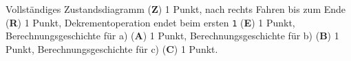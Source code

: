 \begin{bewertung}
Vollständiges Zustandsdiagramm ({\bf Z}) 1 Punkt,
nach rechts Fahren bis zum Ende ({\bf R}) 1 Punkt,
Dekrementoperation endet beim ersten \texttt{1} ({\bf E}) 1 Punkt,
Berechnungsgeschichte für a) ({\bf A}) 1 Punkt,
Berechnungsgeschichte für b) ({\bf B}) 1 Punkt,
Berechnungsgeschichte für c) ({\bf C}) 1 Punkt.
\end{bewertung}


